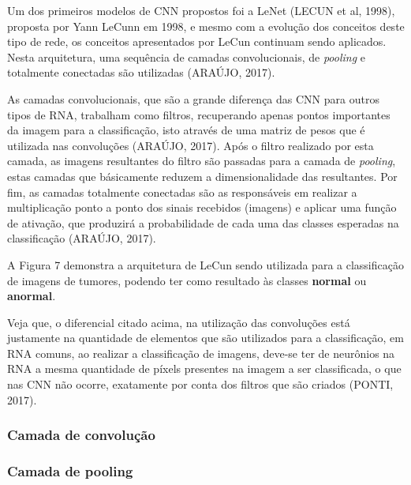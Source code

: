 Um dos primeiros modelos de CNN propostos foi a LeNet (LECUN et al, 1998), proposta por Yann LeCunn em 1998, e mesmo com a evolução dos conceitos deste tipo de rede, os conceitos apresentados por LeCun continuam sendo aplicados. Nesta arquitetura, uma sequência de camadas convolucionais, de \textit{pooling} e totalmente conectadas são utilizadas (ARAÚJO, 2017).

As camadas convolucionais, que são a grande diferença das CNN para outros tipos de RNA, trabalham como filtros, recuperando apenas pontos importantes da imagem para a classificação, isto através de uma matriz de pesos que é utilizada nas convoluções (ARAÚJO, 2017). Após o filtro realizado por esta camada, as imagens resultantes do filtro são passadas para a camada de \textit{pooling}, estas camadas que básicamente reduzem a dimensionalidade das resultantes. Por fim, as camadas totalmente conectadas são as responsáveis em realizar a multiplicação ponto a ponto dos sinais recebidos (imagens) e aplicar uma função de ativação, que produzirá a probabilidade de cada uma das classes esperadas na classificação (ARAÚJO, 2017).

A Figura 7 demonstra a arquitetura de LeCun sendo utilizada para a classificação de imagens de tumores, podendo ter como resultado às classes \textbf{normal} ou \textbf{anormal}.


Veja que, o diferencial citado acima, na utilização das convoluções está justamente na quantidade de elementos que são utilizados para a classificação, em RNA comuns, ao realizar a classificação de imagens, deve-se ter de neurônios na RNA a mesma quantidade de píxels presentes na imagem a ser classificada, o que nas CNN não ocorre, exatamente por conta dos filtros que são criados (PONTI, 2017). 

\subsubsection{Camada de convolução}

\subsubsection{Camada de pooling}


